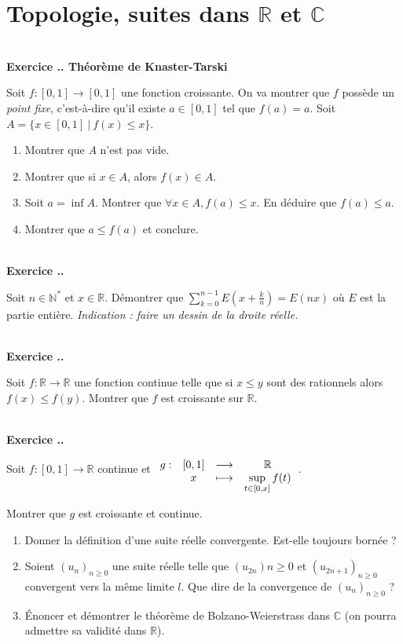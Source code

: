 \documentclass{article}
\newcommand{\fonction}[5]{\raisebox{-0.5\baselineskip}{$\begin{array}{lccc}
    #1: & #2 & \longrightarrow & #3 \\
        & #4 & \longmapsto & #5 \end{array}$}}
\newcommand{\mb}[1]{\mathbb{#1}}
\newcounter{exo}
\newcommand{\exercice}[1][\null]{\textbf{\\ Exercice \thesection.\theexo. #1} \addtocounter{exo}{1}}
\begin{document}
\section{Topologie, suites dans $\mb{R}$ et $\mb{C}$}


\exercice[Théorème de Knaster-Tarski]

Soit $f : [0,1] \rightarrow [0,1]$ une fonction croissante. On va montrer que $f$ possède un \emph{point fixe}, c'est-à-dire qu'il existe $a \in [0,1]$ tel que $f(a) = a$. Soit $A = \{x \in [0,1]~|~f(x)\le x\}$.

\begin{enumerate}

\item Montrer que $A$ n'est pas vide.

\item Montrer que si $x \in A$, alors $f(x) \in A$.

\item Soit $a = \inf A$. Montrer que $\forall x \in A, f(a) \le x$. En déduire que $f(a)\le a$.

\item Montrer que $a \le f(a)$ et conclure.

\end{enumerate}

\exercice

Soit $n \in \mb{N^*}$ et $x \in \mb{R}$. Démontrer que $\displaystyle \sum_{k=0}^{n-1} E\left(x + \frac{k}{n}\right) = E(nx)$ où  $E$ est la partie entière. \emph{Indication : faire un dessin de la droite réelle.}

\exercice

Soit $f : \mb{R} \rightarrow \mb{R}$ une fonction continue telle que si $ x \le y$ sont des rationnels alors $f(x) \le f(y)$. Montrer que $f$ est croissante sur $\mb{R}$.

\exercice

Soit $f : [0,1] \rightarrow \mb{R}$ continue et $\fonction{g}{[0,1]}{\mb{R}}{x}{\displaystyle \sup_{t \in [0,x]} f(t)}$.

Montrer que $g$ est croissante et continue.

\begin{enumerate}

\item Donner la définition d'une suite réelle convergente. Est-elle toujours bornée ?

\item Soient $(u_n)_{n \ge 0}$ une suite réelle telle que $(u_{2n}){n \ge 0}$ et $(u_{2n+1})_{n \ge 0}$ convergent vers la même limite $l$. Que dire de la convergence de $(u_n)_{n \ge 0}$ ?

\item \'Enoncer et démontrer le théorème de Bolzano-Weierstrass dans $\mb{C}$ (on pourra admettre sa validité dans $\mb{R}$).

\end{enumerate}
\end{document}
